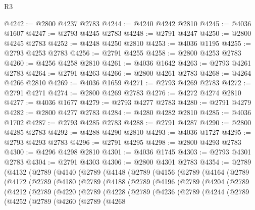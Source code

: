 \begin{lexlean}{R3}
\begin{coremodule}
@4242 := @2800 @4237 @2783
@4244 := @4240 @4242 @2810
@4245 := @4036 @1607
@4247 := @2793 @4245 @2783
@4248 := @2791 @4247
@4250 := @2800 @4245 @2783
@4252 := @4248 @4250 @2810
@4253 := @4036 @1195
@4255 := @2793 @4253 @2783
@4256 := @2791 @4255
@4258 := @2800 @4253 @2783
@4260 := @4256 @4258 @2810
@4261 := @4036 @1642
@4263 := @2793 @4261 @2783
@4264 := @2791 @4263
@4266 := @2800 @4261 @2783
@4268 := @4264 @4266 @2810
@4269 := @4036 @1659
@4271 := @2793 @4269 @2783
@4272 := @2791 @4271
@4274 := @2800 @4269 @2783
@4276 := @4272 @4274 @2810
@4277 := @4036 @1677
@4279 := @2793 @4277 @2783
@4280 := @2791 @4279
@4282 := @2800 @4277 @2783
@4284 := @4280 @4282 @2810
@4285 := @4036 @1702
@4287 := @2793 @4285 @2783
@4288 := @2791 @4287
@4290 := @2800 @4285 @2783
@4292 := @4288 @4290 @2810
@4293 := @4036 @1727
@4295 := @2793 @4293 @2783
@4296 := @2791 @4295
@4298 := @2800 @4293 @2783
@4300 := @4296 @4298 @2810
@4301 := @4036 @1745
@4303 := @2793 @4301 @2783
@4304 := @2791 @4303
@4306 := @2800 @4301 @2783
@4354 := @2789
    (@4132
      (@2789
        (@4140
          (@2789
            (@4148
              (@2789
                (@4156
                  (@2789
                    (@4164
                      (@2789
                        (@4172
                          (@2789
                            (@4180
                              (@2789
                                (@4188
                                  (@2789
                                    (@4196
                                      (@2789
                                        (@4204
                                          (@2789
                                            (@4212
                                              (@2789
                                                (@4220
                                                  (@2789
                                                    (@4228
                                                      (@2789
                                                        (@4236
                                                          (@2789
                                                            (@4244
                                                              (@2789
                                                                (@4252
                                                                  (@2789
                                                                    (@4260
                                                                      (@2789
                                                                        (@4268

\end{coremodule}
\end{lexlean}
